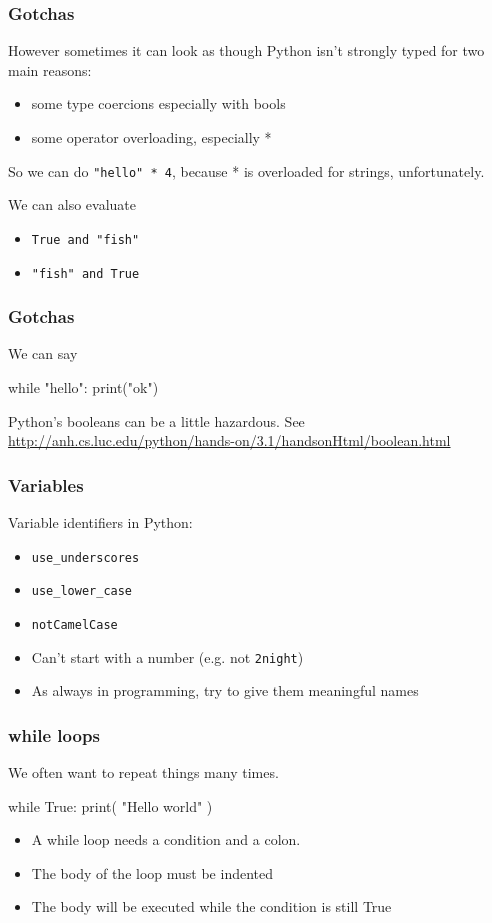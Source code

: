 \documentclass{beamer}
\begin{document}
\begin{frame}[fragile]
\frametitle{Gotchas}
However sometimes it can look as though Python isn't strongly typed
for two main reasons: 
\begin{itemize}
\item some type coercions especially with bools
\item some operator overloading, especially *
\end{itemize}
So we can do \texttt{"hello" * 4}, because * is overloaded for
strings, unfortunately. 

\bigskip

We can also evaluate 
\begin{itemize}
\item \texttt{True and "fish"} 
\item \texttt{"fish" and True}
\end{itemize}

\end{frame}

\begin{frame}[fragile]
\frametitle{Gotchas}

We can say 
\begin{code}
while "hello":
  print("ok")
\end{code}
Python's booleans can be a little hazardous.  See \url{http://anh.cs.luc.edu/python/hands-on/3.1/handsonHtml/boolean.html}
\end{frame}


\begin{frame}[fragile]
\frametitle{Variables}

Variable identifiers in Python:
\begin{itemize}
\item \texttt{use\_underscores}
\item \texttt{use\_lower\_case}
\item \texttt{notCamelCase}
\item Can't start with a number (e.g. not \texttt{2night})
\item As always in programming, try to give them meaningful names
\end{itemize}
\end{frame}

\begin{frame}[fragile]
\frametitle{while loops}
We often want to repeat things many times.
\begin{code}
while True:
   print( "Hello world" )
\end{code}
\begin{itemize}
\item A while loop needs a condition and a colon.
\item The body of the loop must be indented
\item The body will be executed while the condition is still True
\end{itemize}
\end{frame}
\end{document}
